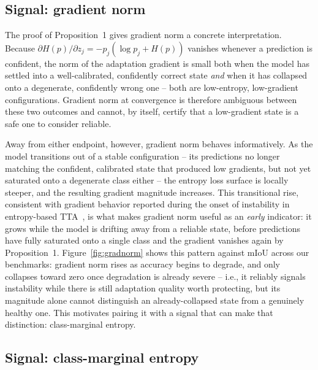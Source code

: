 \subsection{Signal: gradient norm} \label{sec:signal-gradnorm}

The proof of Proposition~1 gives gradient norm a concrete interpretation.
Because $\partial H(p)/\partial z_j = -p_j(\log p_j + H(p))$ vanishes whenever
a prediction is confident, the norm of the adaptation gradient is small both
when the model has settled into a well-calibrated, confidently correct state
\emph{and} when it has collapsed onto a degenerate, confidently wrong one --
both are low-entropy, low-gradient configurations. Gradient norm at
convergence is therefore ambiguous between these two outcomes and cannot,
by itself, certify that a low-gradient state is a safe one to consider
reliable.

Away from either endpoint, however, gradient norm behaves informatively. As
the model transitions out of a stable configuration -- its predictions no
longer matching the confident, calibrated state that produced low gradients,
but not yet saturated onto a degenerate class either -- the entropy loss
surface is locally steeper, and the resulting gradient magnitude increases.
This transitional rise, consistent with gradient behavior reported during
the onset of instability in entropy-based TTA~\citep{niu2023sar}, is what
makes gradient norm useful as an \emph{early} indicator: it grows while the
model is drifting away from a reliable state, before predictions have fully
saturated onto a single class and the gradient vanishes again by
Proposition~1. Figure~\ref{fig:gradnorm} shows this pattern against mIoU
across our benchmarks: gradient norm rises as accuracy begins to degrade, and
only collapses toward zero once degradation is already severe -- i.e., it
reliably signals instability while there is still adaptation quality worth
protecting, but its magnitude alone cannot distinguish an already-collapsed
state from a genuinely healthy one. This motivates pairing it with a signal
that can make that distinction: class-marginal entropy.

\subsection{Signal: class-marginal entropy} \label{sec:signal-hmargin}

